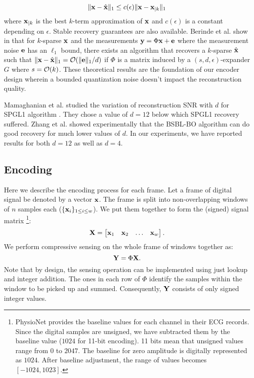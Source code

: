 $$
\| \mathbf{x} - \hat{\mathbf{x}} \|_1 \leq c(\epsilon) \| \mathbf{x} - \mathbf{x}_{|k} \|_1
$$
where $\mathbf{x}_{|k}$ is the best $k$-term approximation of $\mathbf{x}$
and $c(\epsilon)$ is a constant depending on $\epsilon$.
Stable recovery guarantees are also available.
Berinde et al. show in \cite{berinde2008practical} that
for $k$-sparse $\mathbf{x}$ and the measurements $\mathbf{y} = \Phi \mathbf{x} + \mathbf{e}$
where the measurement noise $\mathbf{e}$ has an $\ell_1$ bound,
there exists an algorithm that recovers a $k$-sparse $\hat{\mathbf{x}}$
such that $\| \mathbf{x} - \hat{\mathbf{x}} \|_1 = \mathop{}\mathopen{}\mathcal{O}\mathopen{}\left(\| \mathbf{e} \|_1 / d\right)$
if $\Phi$ is a matrix induced by a $(s,d, \epsilon)$-expander
$G$ where $s = \mathop{}\mathopen{}\mathcal{O}\mathopen{}\left(k\right)$. 
These theoretical results are the foundation of our encoder
design wherein a bounded quantization noise doesn't impact
the reconstruction quality. 

Mamaghanian et al. \cite{mamaghanian2011compressed}
studied the variation of reconstruction SNR with $d$ for SPGL1
algorithm \cite{van2009probing}.
They chose a value of $d=12$ below which
SPGL1 recovery suffered. Zhang et al. \cite{zhang2012compressed}
showed experimentally that the BSBL-BO algorithm can do good
recovery for much lower values of $d$.
In our experiments, we have reported results for both $d=12$
as well as $d=4$.


\subsection{Encoding}


Here we describe the encoding process for each frame.
Let a frame of digital signal be denoted by a vector $\mathbf{x}$.
The frame is split into non-overlapping windows of $n$
samples each ($\{\mathbf{x}_i\}_{1 \le i\le w}$).
We put them together to form the (signed) signal matrix
\footnote{
PhysioNet provides the baseline values for each channel
in their ECG records.
Since the digital samples are unsigned, we have subtracted
them by the baseline value ($1024$ for 11-bit encoding).
11 bits mean that unsigned values range from
$0$ to $2047$. The baseline for zero amplitude is
digitally represented as $1024$.
After baseline adjustment, the range of values becomes
$[-1024,1023]$.
}:
\begin{equation}
\mathbf{X} = \begin{bmatrix}
\mathbf{x}_1 & \mathbf{x}_2 & \dots & \mathbf{x}_w
\end{bmatrix}.
\end{equation}
We perform compressive sensing on the whole frame
of windows together as:
\begin{equation}
\mathbf{Y} = \Phi \mathbf{X}.
\end{equation}
Note that by design, the sensing operation can be implemented
using just lookup and integer addition. The ones
in each row of $\Phi$ identify the samples within the window
to be picked up and summed. Consequently, $\mathbf{Y}$ consists of
only signed integer values.


